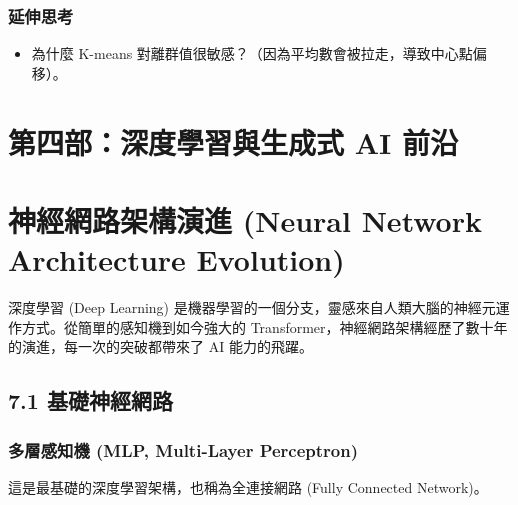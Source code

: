 \documentclass[
  letterpaper,
  DIV=11,
  numbers=noendperiod]{scrreprt}
\providecommand{\tightlist}{%
  \setlength{\itemsep}{0pt}\setlength{\parskip}{0pt}}
\begin{document}
\section{延伸思考}\label{ux5ef6ux4f38ux601dux8003-5}

\begin{itemize}
\tightlist
\item
  為什麼 K-means
  對離群值很敏感？（因為平均數會被拉走，導致中心點偏移）。
\end{itemize}

\part{第四部：深度學習與生成式 AI 前沿}

\part{神經網路架構演進 (Neural Network Architecture
Evolution)}\label{ux795eux7d93ux7db2ux8defux67b6ux69cbux6f14ux9032-neural-network-architecture-evolution}

深度學習 (Deep Learning)
是機器學習的一個分支，靈感來自人類大腦的神經元運作方式。從簡單的感知機到如今強大的
Transformer，神經網路架構經歷了數十年的演進，每一次的突破都帶來了 AI
能力的飛躍。

\chapter{7.1 基礎神經網路}\label{sec-basic-nn}

\section{多層感知機 (MLP, Multi-Layer Perceptron)}\label{sec-mlp}

這是最基礎的深度學習架構，也稱為全連接網路 (Fully Connected Network)。
\end{document}
